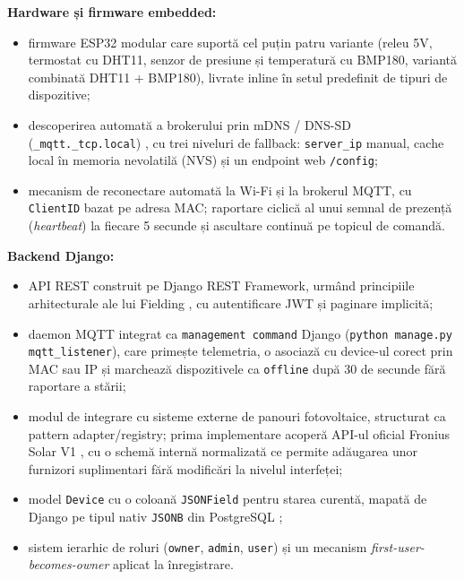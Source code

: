 \textbf{Hardware și firmware embedded:}
\begin{itemize}
    \item firmware ESP32 modular care suportă cel puțin patru variante (releu 5V, termostat cu DHT11, senzor de presiune și temperatură cu BMP180, variantă combinată DHT11 + BMP180), livrate inline în setul predefinit de tipuri de dispozitive;
    \item descoperirea automată a brokerului prin mDNS / DNS-SD (\texttt{\_mqtt.\_tcp.local}) \cite{rfc_mdns, rfc_dnssd}, cu trei niveluri de fallback: \texttt{server\_ip} manual, cache local în memoria nevolatilă (NVS) și un endpoint web \texttt{/config};
    \item mecanism de reconectare automată la Wi-Fi și la brokerul MQTT, cu \texttt{ClientID} bazat pe adresa MAC; raportare ciclică al unui semnal de prezență (\textit{heartbeat}) la fiecare 5 secunde și ascultare continuă pe topicul de comandă.
\end{itemize}

\textbf{Backend Django:}
\begin{itemize}
    \item API REST construit pe Django REST Framework, urmând principiile arhitecturale ale lui Fielding \cite{fielding_rest_dissertation}, cu autentificare JWT \cite{rfc_jwt} și paginare implicită;
    \item daemon MQTT integrat ca \texttt{management command} Django (\texttt{python manage.py mqtt\_listener}), care primește telemetria, o asociază cu device-ul corect prin MAC sau IP și marchează dispozitivele ca \texttt{offline} după 30 de secunde fără raportare a stării;
    \item modul de integrare cu sisteme externe de panouri fotovoltaice, structurat ca pattern adapter/registry; prima implementare acoperă API-ul oficial Fronius Solar V1 \cite{fronius_solar_api}, cu o schemă internă normalizată ce permite adăugarea unor furnizori suplimentari fără modificări la nivelul interfeței;
    \item model \texttt{Device} cu o coloană \texttt{JSONField} pentru starea curentă, mapată de Django pe tipul nativ \texttt{JSONB} din PostgreSQL \cite{postgresql_jsonb_docs};
    \item sistem ierarhic de roluri (\texttt{owner}, \texttt{admin}, \texttt{user}) și un mecanism \textit{first-user-becomes-owner} aplicat la înregistrare.
\end{itemize}

